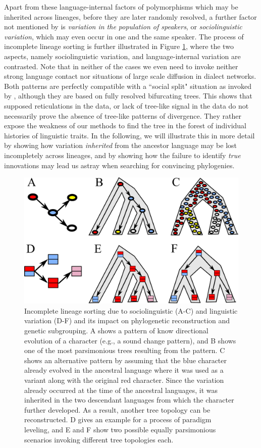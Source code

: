 \documentclass[svgnames,12pt]{scrartcl}
\begin{document}
{{Apart from these language-internal factors of polymorphisms which may be inherited across lineages,
before they are later randomly resolved, a further factor not mentioned by \citet{List2016h} is
\emph{variation in the population of speakers}, or \emph{sociolinguistic variation}, which may even occur in one and the
same speaker.  The process of incomplete lineage sorting is further illustrated in Figure
\ref{fig:ils}, where the two aspects, namely sociolinguistic variation, and language-internal
variation are contrasted. Note that in neither of the cases we even need to invoke neither strong
language contact nor situations of large scale diffusion in dialect networks. Both patterns are
perfectly compatible with a ``social split" situation as invoked by \citet{Francois2015}, although
they are based on fully resolved bifurcating trees. This shows that supposed reticulations in the
data, or lack of tree-like signal in the data do not necessarily prove the absence of tree-like
patterns of divergence. They rather expose the weakness of our methods to find the tree in the
forest of individual histories of linguistic traits. In the following, we will illustrate this
in more detail by showing how variation \emph{inherited} from the ancestor language may be lost
incompletely across lineages, and by showing how the failure to identify \emph{true} innovations may
lead us astray when searching for convincing phylogenies.

\begin{figure}[htb]
  \centering
  \includegraphics[width=\textwidth]{images/ils.pdf}
  \caption{Incomplete lineage sorting due to sociolinguistic (A-C) and linguistic variation (D-F) and its impact
  on phylogenetic reconstruction and genetic subgrouping. A shows a pattern of know directional
  evolution of a character (e.g., a sound change pattern), and B shows one of the most parsimonious
  trees resulting from the pattern. C shows an alternative pattern by assuming that the blue
  character already evolved in the ancestral language where it was used as a variant along with the
  original red character. Since the variation already occurred at the time of the ancestral
  languages, it was inherited in the two descendant languages from which the character further
  developed. As a result, another tree topology can be reconstructed. D gives an example for a
  process of paradigm leveling, and E and F show two possible equally parsimonious scenarios
  invoking different tree topologies each.}
  \label{fig:ils}
\end{figure}


}}
\end{document}
